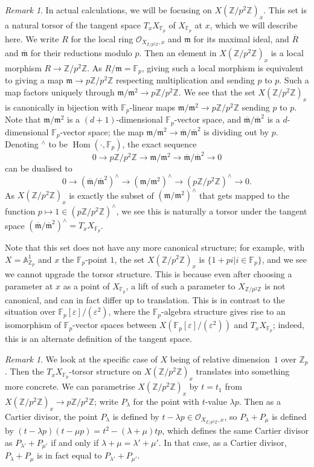 \documentclass[12pt]{article}
\newcommand{\A}{\mathbb{A}}
\newcommand{\Z}{\mathbb{Z}}
\renewcommand{\O}{\mathcal{O}}
\newcommand{\F}{\mathbb{F}}
\newcommand{\m}{\mathfrak{m}}
\DeclareMathOperator{\Hom}{Hom}
\theoremstyle{plain}
\theoremstyle{definition}
\theoremstyle{remark}
\newtheorem{rem}[thm]{Remark} %
\begin{document}
\begin{rem}
\label{rem:torsortangentspace}
In actual calculations, we will be focusing on $X(\Z/p^2\Z)_x$. This set is a natural torsor of the tangent space $T_x X_{\F_p}$ of $X_{\F_p}$ at $x$, which we will describe here. We write $R$ for the local ring $\O_{X_{\Z/p^2\Z},x}$ and $\m$ for its maximal ideal, and $\overline{R}$ and $\overline{\m}$ for their reductions modulo $p$. Then an element in $X(\Z/p^2\Z)_x$ is a local morphism $R \to \Z/p^2\Z$. As $R/\m = \F_p$, giving such a local morphism is equivalent to giving a map $\m \to p\Z/p^2\Z$ respecting multiplication and sending $p$ to $p$. Such a map factors uniquely through $\m/\m^2 \to p\Z/p^2\Z$. We see that the set $X(\Z/p^2\Z)_x$ is canonically in bijection with $\F_p$-linear maps $\m/\m^2 \to p\Z/p^2\Z$ sending $p$ to $p$. Note that $\m/\m^2$ is a $(d+1)$-dimensional $\F_p$-vector space, and $\overline{\m}/\overline{\m}^2$ is a $d$-dimensional $\F_p$-vector space; the map $\m/\m^2 \to \overline{\m}/\overline{\m}^2$ is dividing out by $p$. Denoting ${}^\wedge$ to be $\Hom(\cdot,\F_p)$, the exact sequence
\[
0 \to p\Z/p^2\Z \to \m/\m^2 \to \overline{\m}/\overline{\m}^2 \to 0
\]
can be dualised to
\[
0 \to (\overline{\m}/\overline{\m}^2)^\wedge \to (\m/\m^2)^\wedge \to (p\Z/p^2\Z)^{\wedge} \to 0.
\]
As $X(\Z/p^2\Z)_x$ is exactly the subset of $(\m/\m^2)^\wedge$ that gets mapped to the function $p \mapsto 1 \in (p\Z/p^2\Z)^{\wedge}$, we see this is naturally a torsor under the tangent space $(\overline{\m}/\overline{\m}^2)^\wedge = T_{x} X_{\F_p}$.

Note that this set does not have any more canonical structure; for example, with $X = \A^1_{\Z_p}$ and $x$ the $\F_p$-point $1$, the set $X(\Z/p^2\Z)_x$ is $\{1 + pi | i \in \F_p\}$, and we see we cannot upgrade the torsor structure. This is because even after choosing a parameter at $x$ as a point of $X_{\F_p}$, a lift of such a parameter to $X_{\Z/p^2\Z}$ is not canonical, and can in fact differ up to translation. This is in contrast to the situation over $\F_p[\varepsilon]/(\varepsilon^2)$, where the $\F_p$-algebra structure gives rise to an isomorphism of $\F_p$-vector spaces between $X(\F_p[\varepsilon]/(\varepsilon^2))$ and $T_x X_{\F_p}$; indeed, this is an alternate definition of the tangent space.
\end{rem}

\begin{rem}
\label{rem:cartierlinear}
We look at the specific case of $X$ being of relative dimension~$1$ over $\Z_p$. Then the $T_x X_{\F_p}$-torsor structure on $X(\Z/p^2\Z)_x$ translates into something more concrete. We can parametrise $X(\Z/p^2\Z)_x$ by $t = t_1 $ from $X(\Z/p^2\Z)_x \to p\Z/p^2\Z$; write $P_{\lambda}$ for the point with $t$-value $\lambda p$. Then as a Cartier divisor, the point $P_{\lambda}$ is defined by $t - \lambda p \in \O_{X_{\Z/p^2\Z},x}$, so $P_{\lambda} + P_{\mu}$ is defined by $(t-\lambda p)(t-\mu p) = t^2 - (\lambda + \mu)tp$, which defines the same Cartier divisor as $P_{\lambda'} + P_{\mu'}$ if and only if $\lambda + \mu = \lambda' + \mu'$. In that case, as a Cartier divisor, $P_{\lambda} + P_{\mu}$ is in fact equal to $P_{\lambda'} + P_{\mu'}$.
\end{rem}
\end{document}
